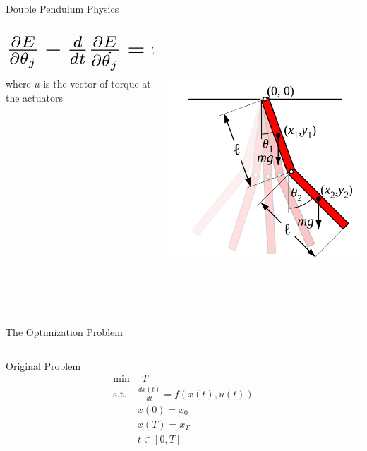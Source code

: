 \documentclass[final]{beamer}
\begin{document}
\begin{frame}{}
{\begin{columns}[t]
\begin{column}{.30\linewidth}
\begin{block}{\centering Double Pendulum Physics}
\begin{columns}[T]
\begin{column}{16cm}{}
	\vspace{0.7cm}
\[ \scalebox{2.3}{$\frac{\partial E}{\partial \theta_j} - \frac{d}{dt}\frac{\partial E}{\partial \dot{\theta_j}} = u$}\]
where $u$ is the vector of torque at the actuators
\end{column}
\begin{column}{16cm}{}
\centering\includegraphics[height=10cm, width = 10cm]{figures/double-pendulum.png}\\
\end{column}

\end{columns}

\end{block}

                
                

\begin{block}{\centering The Optimization Problem}


\begin{columns}[T]

\begin{column}{10cm}{}

	\underline{Original Problem}
\begin{align*}
\min  & \: \:T \\
\mbox{s.t. } & \frac{dx(t)}{dt} = f(x(t),u(t)) \\
& x(0) = x_0 \\
& x(T) = x_T \\
& t \in [0, T]
\end{align*}




\end{column}
\end{columns}
\end{block}
\end{column}
\end{columns}}
\end{frame}
\end{document}

